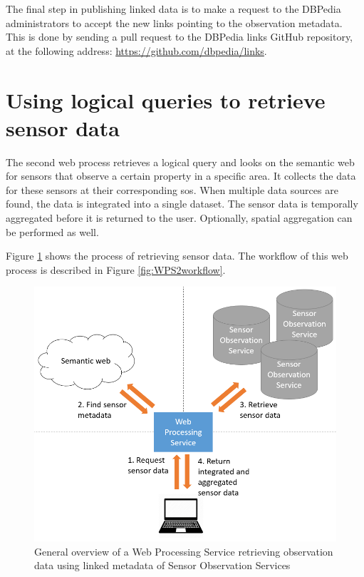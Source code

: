 The final step in publishing linked data is to make a request to the DBPedia administrators to accept the new links pointing to the observation metadata. This is done by sending a pull request to the DBPedia links GitHub repository, at the following address: \url{https://github.com/dbpedia/links}.


\section{Using logical queries to retrieve sensor data}
\label{par:logicalDesign}
The second web process retrieves a logical query and looks on the semantic web for sensors that observe a certain property in a specific area. It collects the data for these sensors at their corresponding \acl{sos}. When multiple data sources are found, the data is integrated into a single dataset. The sensor data is temporally aggregated before it is returned to the user. Optionally, spatial aggregation can be performed as well.

Figure \ref{fig:WPS2} shows the process of retrieving sensor data. The workflow of this web process is described in Figure \ref{fig:WPS2workflow}.

\begin{figure}
	\centering
	\includegraphics[width=0.8\linewidth]{UML/wps2diagram.PNG}
	\caption{General overview of a Web Processing Service retrieving observation data using linked metadata of Sensor Observation Services}
	\label{fig:WPS2}
\end{figure}

